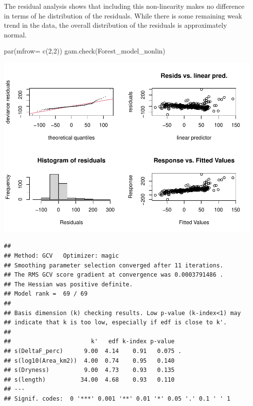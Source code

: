 \documentclass[]{elsarticle} %
\newenvironment{Shaded}{\begin{snugshade}}{\end{snugshade}}
\newcommand{\AttributeTok}[1]{\textcolor[rgb]{0.77,0.63,0.00}{#1}}
\newcommand{\DecValTok}[1]{\textcolor[rgb]{0.00,0.00,0.81}{#1}}
\newcommand{\FunctionTok}[1]{\textcolor[rgb]{0.00,0.00,0.00}{#1}}
\newcommand{\NormalTok}[1]{#1}
\begin{document}
The residual analysis shows that including this non-linearity makes no difference in terms of he distribution of the residuals. While there is some remaining weak trend in the data, the overall distribution of the residuals is approximately normal.

\begin{Shaded}
\begin{Highlighting}[]
\FunctionTok{par}\NormalTok{(}\AttributeTok{mfrow=} \FunctionTok{c}\NormalTok{(}\DecValTok{2}\NormalTok{,}\DecValTok{2}\NormalTok{))}
\FunctionTok{gam.check}\NormalTok{(Forest\_model\_nonlin)}
\end{Highlighting}
\end{Shaded}

\includegraphics{SupplementaryMaterialPart3_files/figure-latex/unnamed-chunk-11-1.pdf}

\begin{verbatim}
## 
## Method: GCV   Optimizer: magic
## Smoothing parameter selection converged after 11 iterations.
## The RMS GCV score gradient at convergence was 0.0003791486 .
## The Hessian was positive definite.
## Model rank =  69 / 69 
## 
## Basis dimension (k) checking results. Low p-value (k-index<1) may
## indicate that k is too low, especially if edf is close to k'.
## 
##                       k'   edf k-index p-value  
## s(DeltaF_perc)      9.00  4.14    0.91   0.075 .
## s(log10(Area_km2))  4.00  0.74    0.95   0.140  
## s(Dryness)          9.00  4.73    0.93   0.135  
## s(length)          34.00  4.68    0.93   0.110  
## ---
## Signif. codes:  0 '***' 0.001 '**' 0.01 '*' 0.05 '.' 0.1 ' ' 1
\end{verbatim}

\renewcommand\refname{References}

\end{document}
